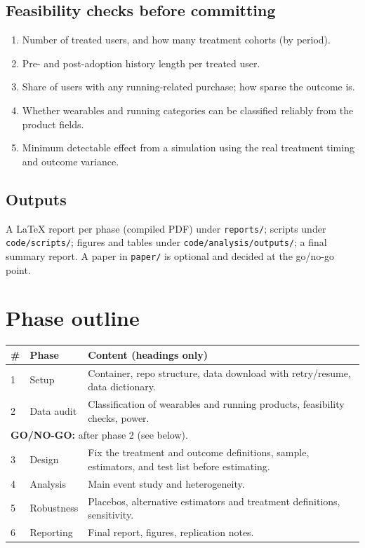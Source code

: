 \documentclass[11pt]{article}
\begin{document}
\subsection*{Feasibility checks before committing}
\begin{enumerate}
  \item Number of treated users, and how many treatment cohorts (by period).
  \item Pre- and post-adoption history length per treated user.
  \item Share of users with any running-related purchase; how sparse the outcome is.
  \item Whether wearables and running categories can be classified reliably from the product fields.
  \item Minimum detectable effect from a simulation using the real treatment timing and outcome variance.
\end{enumerate}

\subsection*{Outputs}
A LaTeX report per phase (compiled PDF) under \texttt{reports/}; scripts under \texttt{code/scripts/};
figures and tables under \texttt{code/analysis/outputs/}; a final summary report. A paper in \texttt{paper/} is
optional and decided at the go/no-go point.

\section{Phase outline}
\begin{tabular}{p{}p{}p{}}
\toprule
\# & Phase & Content (headings only) \\
\midrule
1 & Setup & Container, repo structure, data download with retry/resume, data dictionary. \\
2 & Data audit & Classification of wearables and running products, feasibility checks, power. \\
\multicolumn{3}{l}{\textbf{GO/NO-GO:} after phase 2 (see below).} \\
3 & Design & Fix the treatment and outcome definitions, sample, estimators, and test list before estimating. \\
4 & Analysis & Main event study and heterogeneity. \\
5 & Robustness & Placebos, alternative estimators and treatment definitions, sensitivity. \\
6 & Reporting & Final report, figures, replication notes. \\
\bottomrule
\end{tabular}
\end{document}
